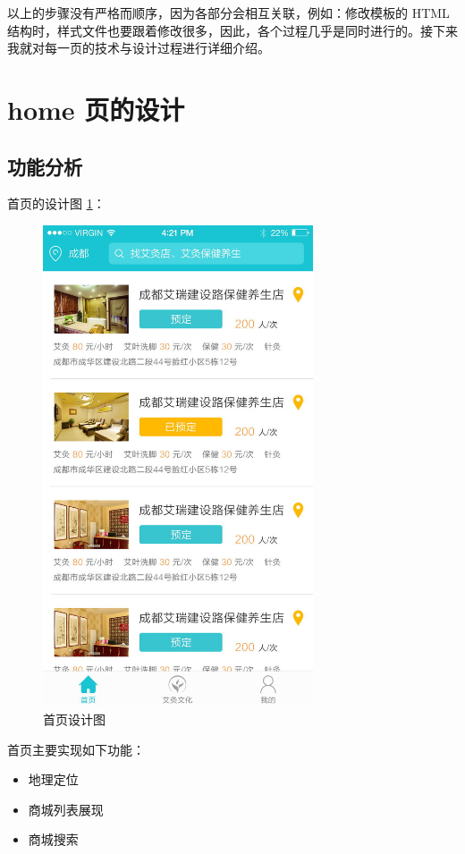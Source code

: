 \documentclass[UTF8]{ctexbook}
\begin{document}
        \par
        以上的步骤没有严格而顺序，因为各部分会相互关联，例如：修改模板的 HTML 结构时，样式文件也要跟着修改很多，因此，各个过程几乎是同时进行的。接下来我就对每一页的技术与设计过程进行详细介绍。

  \section{home 页的设计}
    \label{sec:home_页的设计}

    \subsection{功能分析}
      \label{subsec:功能分析}
        首页的设计图 \ref{fig:home}：
        \begin{figure}[H]
          \centering
          \includegraphics[width=8cm]{img/201705181050.jpg}
          \caption{首页设计图}
          \label{fig:home}
        \end{figure}
        首页主要实现如下功能：
        \begin{itemize}
          \item 地理定位
          \item 商城列表展现
          \item 商城搜索
        \end{itemize}
\end{document}
